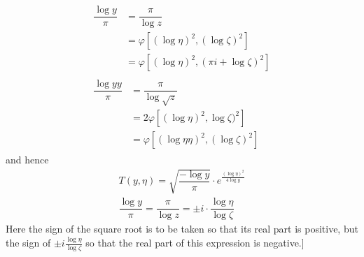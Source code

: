 \[
\begin{gathered}\begin{aligned}\dfrac{\log y}{\pi}&=\dfrac{\pi}{\log z}\\[7pt]&=\varphi[(\log\eta)^2,(\log\zeta)^2]\\[7pt]&=\varphi[(\log\eta)^2,(\pi i+\log\zeta)^2]\end{aligned}\\[10pt]\begin{aligned}\dfrac{\log yy}{\pi}&=\dfrac{\pi}{\log\surd  z}\\[7pt]&=2\varphi[(\log\eta)^2,\log\zeta)^2]\\[7pt]&=\varphi[(\log\eta\eta)^2,(\log\zeta)^2]\end{aligned}\end{gathered}
\]
and hence
\[
\begin{gathered}
T(y,\eta)=\surd {\dfrac{-\log y}{\pi}}\cdot e^{\frac{(\log\eta)^2}{4\log y}}\\[7pt]
\dfrac{\log y}{\pi}=\dfrac{\pi}{\log z}=\mathbin{\pm}i\cdot\dfrac{\log\eta}{\log\zeta}
\end{gathered}
\]
Here the sign of the square root is to be taken so that its real part is positive, but the sign of $\mathbin{\pm}i\frac{\log\eta}{\log\zeta}$ so that the real part of this expression is negative.]

\clearpage
\endgroup
